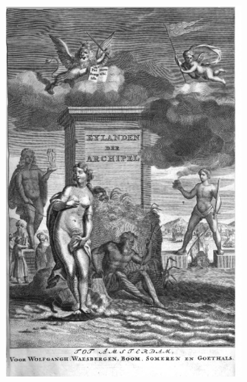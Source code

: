 \begin{figure}
\centering
    \begin{subfigure}[b]{0.4\textwidth}
\includegraphics[width=\textwidth]{resources/good_quality}
    \end{subfigure}
    \begin{subfigure}[b]{0.4\textwidth}

\end{subfigure}
\end{figure}
